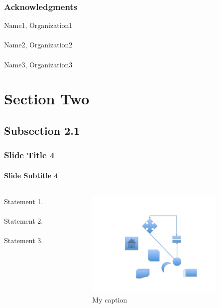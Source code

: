 \documentclass[xcolor={usenames,dvipsnames},hyperref={hyperindex,bookmarks}]{beamer}
\begin{document}

\begin{frame}
	\frametitle{Acknowledgments}
	Name1, Organization1 \\
	\ \\
	Name2, Organization2 \\
	\ \\
	Name3, Organization3
\end{frame}

\section{Section Two}


\subsection{Subsection 2.1}


\begin{frame}
	\frametitle{Slide Title 4}
	\framesubtitle{Slide Subtitle 4}
	
	\begin{columns}[t]			%
		\begin{column}[T]{5cm}	%
		
		Statement 1. \\
		\ \\
		Statement 2. \\
		\ \\
		Statement 3.
		\end{column}
		
		\begin{column}[T]{5cm}	%
			\begin{figure}
			\centering
			\includegraphics[height=2in]{./pics/my_figure}
			\caption{My caption \cite{Petroski1992,Kopka2004}}
			\end{figure}
		\end{column}
	\end{columns}
\end{frame}
\end{document}
